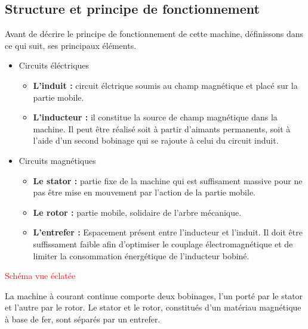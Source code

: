\documentclass{article}
\begin{document}
\subsection{Structure et principe de fonctionnement}

Avant de décrire le principe de fonctionnement de cette machine, définissons dans ce qui suit, ses principaux éléments.\medskip

\begin{itemize}
    \item Circuits éléctriques
    \begin{itemize}
        \item \textbf{L'induit :} circuit élctrique soumis au champ magnétique et placé sur la partie mobile.
        \item \textbf{L'inducteur :} il constitue la source de champ magnétique dans la machine. Il peut être réalisé soit à partir d'aimants permanents, soit à l'aide d'un second bobinage qui se rajoute à celui du circuit induit. 
    \end{itemize}
    \item Circuits magnétiques
    \begin{itemize}
        \item \textbf{Le stator :} partie fixe de la machine qui est suffisament massive pour ne pas être mise en mouvement par l'action de la partie mobile.
        \item \textbf{Le rotor :} partie mobile, solidaire de l'arbre mécanique.
        \item \textbf{L'entrefer :} Espacement présent entre l'inducteur et l'induit. Il doit être suffissament faible afin d'optimiser le couplage électromagnétique et de limiter la consommation énergétique de l'inducteur bobiné.
    \end{itemize}
\end{itemize}


\textcolor{red}{Schéma vue éclatée}


La machine à courant continue comporte deux bobinages, l'un porté par le stator et l'autre par le rotor. Le stator et le rotor, constitués d'un matériau magnétique à base de fer, sont séparés par un entrefer.\medskip
\end{document}

